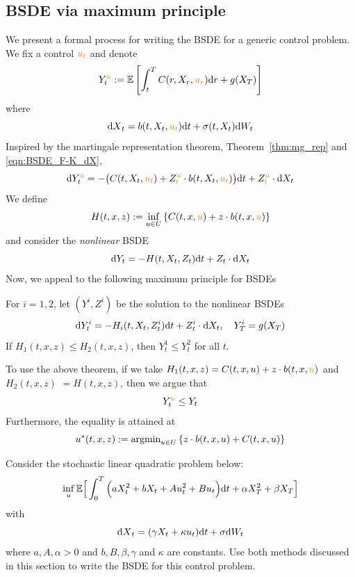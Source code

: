 \documentclass[11pt]{book}
\newcommand{\dd}{\text{\normalfont d}}
\newcommand{\dt}{\text{\normalfont d}t}
\newcommand{\dr}{\text{\normalfont d}r}
\newcommand{\dX}{\text{\normalfont d}X}
\newcommand{\dW}{\text{\normalfont d}W}
\begin{document}
\subsection{BSDE via maximum principle}
We present a formal process for writing the BSDE for a generic control problem.  We fix a control ${\color{orange}u_t}$ and denote
\[
Y^{{\color{orange}u}}_t:=\mathbb{E}\left[\int_t^T C(r,X_r,{\color{orange}u_r})\dr+g(X_T)\right]
\]
where 
\[
{\dX}_t =b(t,X_t,{\color{orange}u_t}){\dt}+\sigma(t,X_t)\dW_t
\]
Inspired by the martingale representation theorem, Theorem~\ref{thm:mg_rep} and \eqref{eqn:BSDE_F-K_dX},  
\[
\dd Y^{{\color{orange}u}}_t = - \big(C(t,X_t,{\color{orange}u_t}) + Z_t^{\color{orange}u}\cdot b(t,X_t,{\color{orange}u_t})\big) \dt + Z_t^{\color{orange}u}\cdot \dX_t
\]
We define
\[
H(t,x,z):=\inf_{u\in U}\left\{C(t,x,{\color{orange}u}) + z\cdot  b(t,x,{\color{orange}u})\right\}
\]
and consider the \emph{nonlinear} BSDE 
\begin{equation}
\label{eqn:BSDE_pre_formal}
    \dd Y_t =  - H(t,X_t,Z_t) \dt + Z_t\cdot \dd X_t
\end{equation}
Now, we appeal to the following maximum principle for BSDEs
\begin{thm}
    For $i=1,2$, let $(Y^i,Z^i)$ be the solution to the nonlinear BSDEs
    \[
    \dd Y^i_t =  - H_i(t,X_t,Z^i_t) \dt + Z^i_t\cdot \dd X_t,~~~Y^i_T=g(X_T)
    \]
    If $H_1(t,x,z)\le H_2(t,x,z)$, then $Y^1_t\le Y^2_t$ for all $t$.
\end{thm}
To use the above theorem, if we take $H_1(t,x,z)=C(t,x,u) + z\cdot  b(t,x,{\color{orange}u})$ and $H_2(t,x,z)$ $=H(t,x,z)$, then we argue that 
\[
Y^{{\color{orange}u}}_t\le Y_t
\]
Furthermore, the equality is attained at
\[
u^*(t,x,z):=\text{\normalfont argmin}_{u\in U}\left\{z\cdot b(t,x,u) + C(t,x,u)\right\}
\]

\begin{ex}
    Consider the stochastic linear quadratic problem below:
    \begin{equation}
        \inf_u\mathbb{E}\Big[\int_0^T \Big(aX_t^2+bX_t +Au_t^2 + Bu_t\Big){\dt}+\alpha X_T^2+\beta X_T\Big]
    \end{equation}
    with
    \begin{equation}
        {\dX}_t=(\gamma X_t+\kappa u_t){\dt}+\sigma \dW_t
    \end{equation}
where $a,A, \alpha>0$ and $b,B,\beta,\gamma$ and $\kappa$ are constants.
Use both methods discussed in this section to write the BSDE for this control problem.
\end{ex}
\end{document}
